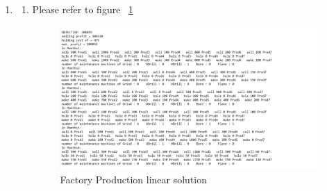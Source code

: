 \documentclass[12pt,a4paper]{article}
\makeatletter
\newtheorem*{solution}{Solution}
\theoremstyle{definition}
\renewenvironment{solution}[1][Solution] {\par\pushQED{\qed}\normalfont\topsep6\p@\@plus6\p@\relax\trivlist\item[\hskip\labelsep\bfseries#1\@addpunct{.}]\ignorespaces}{\popQED\endtrivlist\@endpefalse} \makeatother
\makeatother
\begin{document}
\begin{enumerate}
\begin{solution}
\begin{enumerate}
    \item Please refer to figure ~\ref{factory}
    \begin{figure}[htbp]
        \centering
        \includegraphics[width=1.2\textwidth]{factory.png}
        \caption{Factory Production linear solution}\label{factory}
        \end{figure}
    \end{enumerate}
    
    \end{solution}

\end{enumerate}
\newpage
\vspace{20pt}
\end{document}
